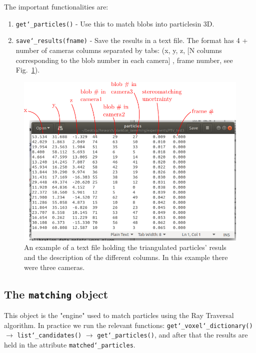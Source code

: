 \documentclass[10pt,a4paper]{article}
\begin{document}
The important functionalities are:
%
\begin{enumerate}
	\item \texttt{get\char`_particles()} - Use this to match blobs into particlesin 3D.
	\item \texttt{save\char`_results(fname)} - Save the results in a text file. The format has 4 + number of cameras columns separated by tabs:
	(x, y, z, [N columns corresponding to the blob number in each camera] , frame number, see Fig.~\ref{fig:particlefile}).
\end{enumerate}



\begin{figure}[h!]
	\centering
	\includegraphics[width=12cm]{particle_file.pdf}
	\caption{An example of a text file holding the triangulated particles' resuls and the description of the different columns. In this example there were three cameras. \label{fig:particlefile}} 
\end{figure}




\subsection{The \texttt{matching} object}

This object is the "engine" used to match particles using the Ray Traversal algorithm. In practice we run the relevant functions: \texttt{get\char`_voxel\char`_dictionary()} $\rightarrow$ \texttt{list\char`_candidates()} $\rightarrow$ \texttt{get\char`_particles()}, and after that the results are held in the attribute \texttt{matched\char`_particles}.
\end{document}
